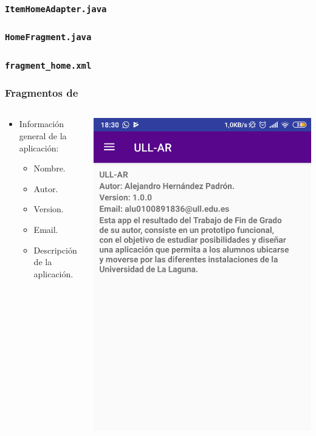          
      
\begin{frame}
	\frametitle{\texttt{ItemHomeAdapter.java}}
	
\end{frame}

         

\begin{frame}
	\frametitle{\texttt{HomeFragment.java}}
	
\end{frame}

\begin{frame}
	\frametitle{\texttt{fragment\_home.xml}}
	
\end{frame}


\begin{frame}
	\frametitle{Fragmentos de \ULLAR{}}
	\begin{columns}
		\begin{column}{0.6\textwidth}
			\begin{itemize}
				\item Información general de la aplicación:
				\begin{itemize}
					\item Nombre.
					\item Autor.
					\item Version.
					\item Email.
					\item Descripción de la aplicación.
				\end{itemize}
			\end{itemize}
			\endblock{}
		\end{column}
		\begin{column}{0.4\textwidth} 
			\vfill 
			\begin{center}
				\includegraphics[width=0.8\linewidth]{Images/infoApp}

\end{center}
\end{column}
\end{columns}
\end{frame}
